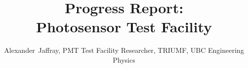 \documentclass[journal]{IEEEtran}
\begin{document}
%
\title{Progress Report: \\Photosensor Test Facility}
%
%
%

\author{Alexander~Jaffray, PMT Test Facility Researcher, TRIUMF, UBC Engineering Physics}%

% 
%



%
{}
% 
\end{document}
